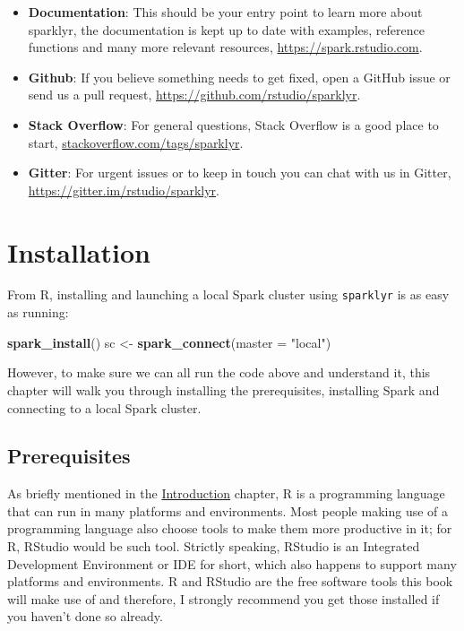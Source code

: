 \documentclass[]{book}
\newenvironment{Shaded}{\begin{snugshade}}{\end{snugshade}}
\newcommand{\DataTypeTok}[1]{\textcolor[rgb]{0.13,0.29,0.53}{#1}}
\newcommand{\KeywordTok}[1]{\textcolor[rgb]{0.13,0.29,0.53}{\textbf{#1}}}
\newcommand{\NormalTok}[1]{#1}
\newcommand{\StringTok}[1]{\textcolor[rgb]{0.31,0.60,0.02}{#1}}
\providecommand{\tightlist}{%
  \setlength{\itemsep}{0pt}\setlength{\parskip}{0pt}}
\theoremstyle{definition}
\theoremstyle{definition}
\theoremstyle{definition}
\theoremstyle{remark}
\begin{document}
\begin{itemize}
\tightlist
\item
  \textbf{Documentation}: This should be your entry point to learn more
  about sparklyr, the documentation is kept up to date with examples,
  reference functions and many more relevant resources,
  \url{https://spark.rstudio.com}.
\item
  \textbf{Github}: If you believe something needs to get fixed, open a
  GitHub issue or send us a pull request,
  \url{https://github.com/rstudio/sparklyr}.
\item
  \textbf{Stack Overflow}: For general questions, Stack Overflow is a
  good place to start, \url{stackoverflow.com/tags/sparklyr}.
\item
  \textbf{Gitter}: For urgent issues or to keep in touch you can chat
  with us in Gitter, \url{https://gitter.im/rstudio/sparklyr}.
\end{itemize}

\hypertarget{installation}{%
\chapter{Installation}\label{installation}}

From R, installing and launching a local Spark cluster using
\texttt{sparklyr} is as easy as running:

\begin{Shaded}
\begin{Highlighting}[]
\KeywordTok{spark_install}\NormalTok{()}
\NormalTok{sc <-}\StringTok{ }\KeywordTok{spark_connect}\NormalTok{(}\DataTypeTok{master =} \StringTok{"local"}\NormalTok{)}
\end{Highlighting}
\end{Shaded}

However, to make sure we can all run the code above and understand it,
this chapter will walk you through installing the prerequisites,
installing Spark and connecting to a local Spark cluster.

\hypertarget{prerequisites}{%
\section{Prerequisites}\label{prerequisites}}

As briefly mentioned in the \protect\hyperlink{intro}{Introduction}
chapter, R is a programming language that can run in many platforms and
environments. Most people making use of a programming language also
choose tools to make them more productive in it; for R, RStudio would be
such tool. Strictly speaking, RStudio is an Integrated Development
Environment or IDE for short, which also happens to support many
platforms and environments. R and RStudio are the free software tools
this book will make use of and therefore, I strongly recommend you get
those installed if you haven't done so already.
\end{document}
